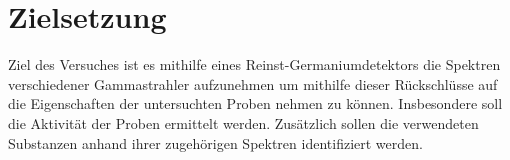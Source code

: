 
\section{Zielsetzung}
\label{sec:Zielsetzung}
Ziel des Versuches ist es mithilfe eines Reinst-Germaniumdetektors die Spektren verschiedener Gammastrahler aufzunehmen um mithilfe dieser Rückschlüsse auf die Eigenschaften der untersuchten Proben nehmen zu können. Insbesondere soll die Aktivität der Proben ermittelt werden. Zusätzlich sollen die verwendeten Substanzen anhand ihrer zugehörigen Spektren identifiziert werden.%
